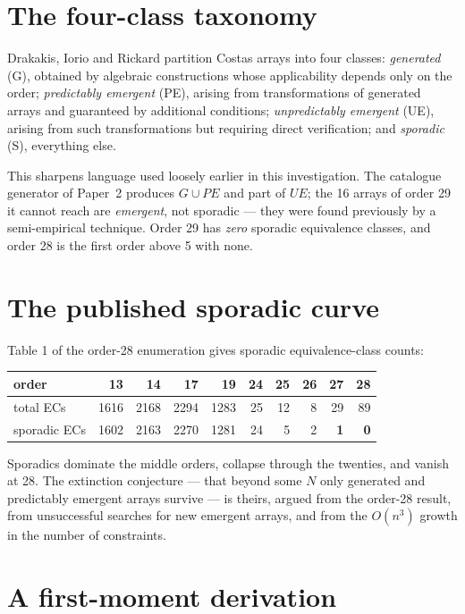 \documentclass[11pt,a4paper,oneside]{report}
\theoremstyle{definition}
\begin{document}
\section{The four-class taxonomy}

Drakakis, Iorio and Rickard partition Costas arrays into four classes:
\emph{generated} (G), obtained by algebraic constructions whose applicability
depends only on the order; \emph{predictably emergent} (PE), arising from
transformations of generated arrays and guaranteed by additional conditions;
\emph{unpredictably emergent} (UE), arising from such transformations but
requiring direct verification; and \emph{sporadic} (S), everything else.

This sharpens language used loosely earlier in this investigation. The catalogue generator of Paper~2 produces $G\cup PE$ and part of $UE$; the
16 arrays of order 29 it cannot reach are \emph{emergent}, not sporadic --- they
were found previously by a semi-empirical technique. Order 29 has \emph{zero}
sporadic equivalence classes, and order 28 is the first order above 5 with none.

\section{The published sporadic curve}

Table 1 of the order-28 enumeration gives sporadic equivalence-class counts:

\begin{center}
\begin{tabular}{@{}lrrrrrrrrr@{}}
\toprule
order & 13 & 14 & 17 & 19 & 24 & 25 & 26 & 27 & 28 \\
\midrule
total ECs & 1616 & 2168 & 2294 & 1283 & 25 & 12 & 8 & 29 & 89 \\
sporadic ECs & 1602 & 2163 & 2270 & 1281 & 24 & 5 & 2 & \textbf{1} & \textbf{0} \\
\bottomrule
\end{tabular}
\end{center}

Sporadics dominate the middle orders, collapse through the twenties, and vanish
at 28. The extinction conjecture --- that beyond some $N$ only generated and
predictably emergent arrays survive --- is theirs, argued from the order-28
result, from unsuccessful searches for new emergent arrays, and from the
$O(n^3)$ growth in the number of constraints.

\section{A first-moment derivation}
\end{document}
